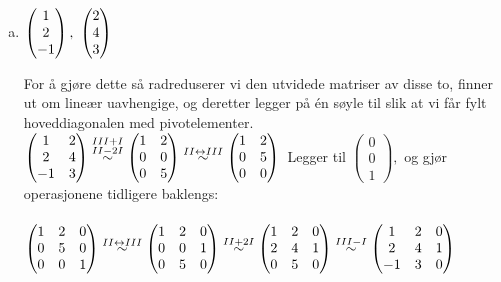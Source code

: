 \documentclass{article}
\newcommand{\vect}[1]{\begin{pmatrix} #1 \end{pmatrix}}
\newcommand{\lra}{\leftrightarrow}
\newcommand{\eqqto}[1]{\overset{\substack{#1}}{\sim}}
\begin{document}
\begin{enumerate}[a)]

    \item \(
    \vect{1\\2\\-1}, \ \vect{2\\4\\3}
    \\\\\)

    For å gjøre dette så radreduserer vi den utvidede matriser av disse to, finner ut om lineær uavhengige, og deretter legger på én søyle til slik at vi får fylt hoveddiagonalen med pivotelementer.\\

    \(
    \begin{pmatrix}
        1&2\\
        2&4\\
        -1&3
    \end{pmatrix}
    \eqqto{III+I\\II-2I}
    \begin{pmatrix}
        1&2\\
        0&0\\
        0&5
    \end{pmatrix}
    \eqqto{II \lra III}
    \begin{pmatrix}
        1&2\\
        0&5\\
        0&0
    \end{pmatrix}
    \\\\\)
    Legger til $\vect{0\\0\\1},$ og gjør operasjonene tidligere baklengs: \\\\
    \( 
    \begin{pmatrix}
        1&2&0\\
        0&5&0\\
        0&0&1
    \end{pmatrix}
    \eqqto{II \lra III}
    \begin{pmatrix}
        1&2&0\\
        0&0&1\\
        0&5&0
    \end{pmatrix}
    \eqqto{II+2I}
    \begin{pmatrix}
        1&2&0\\
        2&4&1\\
        0&5&0
    \end{pmatrix}
    \eqqto{III-I}
    \begin{pmatrix}
        1&2&0\\
        2&4&1\\
        -1&3&0
    \end{pmatrix}
    \\\\\)


\end{enumerate}
\end{document}
